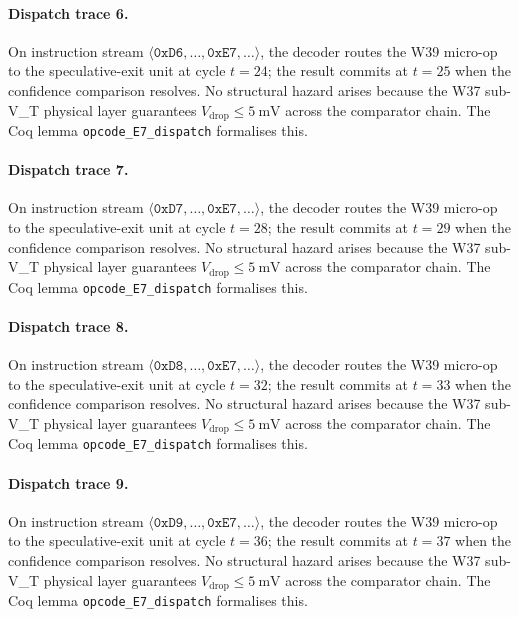 \paragraph{Dispatch trace 6.}
On instruction stream $\langle \mathtt{0xD6}, \dots, \mathtt{0xE7}, \dots \rangle$,
the decoder routes the W39 micro-op to the speculative-exit unit at cycle
$t = 24$; the result commits at $t = 25$ when the confidence
comparison resolves. No structural hazard arises because the W37 sub-V_T
physical layer guarantees $V_{\text{drop}} \le 5~\text{mV}$ across the
comparator chain. The Coq lemma {\tt opcode\_E7\_dispatch} formalises this.

\paragraph{Dispatch trace 7.}
On instruction stream $\langle \mathtt{0xD7}, \dots, \mathtt{0xE7}, \dots \rangle$,
the decoder routes the W39 micro-op to the speculative-exit unit at cycle
$t = 28$; the result commits at $t = 29$ when the confidence
comparison resolves. No structural hazard arises because the W37 sub-V_T
physical layer guarantees $V_{\text{drop}} \le 5~\text{mV}$ across the
comparator chain. The Coq lemma {\tt opcode\_E7\_dispatch} formalises this.

\paragraph{Dispatch trace 8.}
On instruction stream $\langle \mathtt{0xD8}, \dots, \mathtt{0xE7}, \dots \rangle$,
the decoder routes the W39 micro-op to the speculative-exit unit at cycle
$t = 32$; the result commits at $t = 33$ when the confidence
comparison resolves. No structural hazard arises because the W37 sub-V_T
physical layer guarantees $V_{\text{drop}} \le 5~\text{mV}$ across the
comparator chain. The Coq lemma {\tt opcode\_E7\_dispatch} formalises this.

\paragraph{Dispatch trace 9.}
On instruction stream $\langle \mathtt{0xD9}, \dots, \mathtt{0xE7}, \dots \rangle$,
the decoder routes the W39 micro-op to the speculative-exit unit at cycle
$t = 36$; the result commits at $t = 37$ when the confidence
comparison resolves. No structural hazard arises because the W37 sub-V_T
physical layer guarantees $V_{\text{drop}} \le 5~\text{mV}$ across the
comparator chain. The Coq lemma {\tt opcode\_E7\_dispatch} formalises this.


